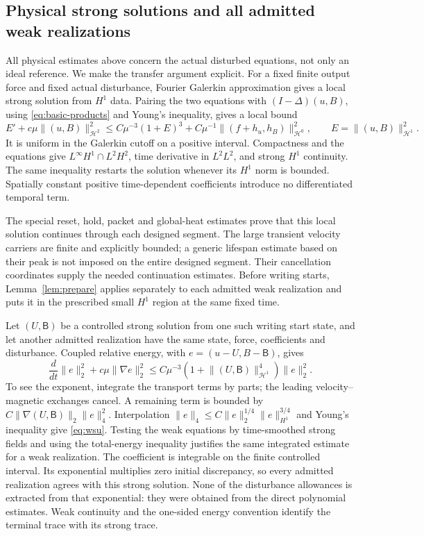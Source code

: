 \documentclass[11pt,a4paper]{amsart}
\theoremstyle{definition}
\theoremstyle{remark}
\numberwithin{equation}{section}
\newcommand{\Hcal}{\mathcal H}
\newcommand{\norm}[1]{\lVert #1\rVert}
\begin{document}
\subsection{Physical strong solutions and all admitted weak realizations}
All physical estimates above concern the actual disturbed equations,
not only an ideal reference. We make the transfer argument explicit.
For a fixed finite output force and fixed actual disturbance, Fourier
Galerkin approximation gives a local strong solution from $H^1$ data.
Pairing the two equations with $(I-\Delta)(u,B)$, using
\eqref{eq:basic-products} and Young's inequality, gives a local bound
\[
 E'+c\mu\norm{(u,B)}_{\Hcal^2}^2
 \le C\mu^{-3}(1+E)^3+C\mu^{-1}\norm{(f+h_u,h_B)}_{\Hcal^0}^2,
 \qquad E=\norm{(u,B)}_{\Hcal^1}^2.
\]
It is uniform in the Galerkin cutoff on a positive interval. Compactness
and the equations give $L^\infty H^1\cap L^2H^2$, time derivative in
$L^2L^2$, and strong $H^1$ continuity. The same inequality restarts the
solution whenever its $H^1$ norm is bounded. Spatially constant positive
time-dependent coefficients introduce no differentiated temporal term.

The special reset, hold, packet and global-heat estimates prove that this
local solution continues through each designed segment. The large transient
velocity carriers are finite and explicitly bounded; a generic lifespan
estimate based on their peak is not imposed on the entire designed segment.
Their cancellation coordinates supply the needed continuation estimates.
Before writing starts, Lemma~\ref{lem:prepare} applies separately to each
admitted weak realization and puts it in the prescribed small $H^1$ region
at the same fixed time.

Let $(U,\mathsf B)$ be a controlled strong solution from one such writing
start state, and let another admitted realization have the same state,
force, coefficients and disturbance. Coupled relative energy, with
$e=(u-U,B-\mathsf B)$, gives
\begin{equation}\label{eq:wsu}
 \frac d{dt}\norm e_2^2+c\mu\norm{\nabla e}_2^2
 \le C\mu^{-3}
   (1+\norm{(U,\mathsf B)}_{\Hcal^1}^4)\norm e_2^2.
\end{equation}
To see the exponent, integrate the transport terms by parts; the leading
velocity--magnetic exchanges cancel. A remaining term is bounded by
$C\norm{\nabla(U,\mathsf B)}_2\norm e_4^2$.
Interpolation $\norm e_4\le C\norm e_2^{1/4}\norm e_{H^1}^{3/4}$ and
Young's inequality give \eqref{eq:wsu}. Testing the weak equations by
time-smoothed strong fields and using the total-energy inequality justifies
the same integrated estimate for a weak realization. The coefficient is
integrable on the finite controlled interval. Its exponential multiplies
zero initial discrepancy, so every admitted realization agrees with this
strong solution. None of the disturbance allowances is extracted from that
exponential: they were obtained from the direct polynomial estimates.
Weak continuity and the one-sided energy convention identify the terminal
trace with its strong trace.
\end{document}
